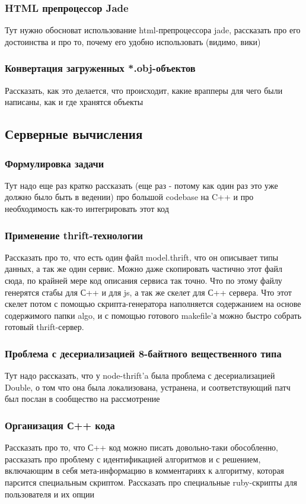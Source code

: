 \documentclass[12pt, a4paper]{article}
\begin{document}
\subsubsection{HTML препроцессор Jade}
Тут нужно обосноват использование html-препроцессора jade, рассказать про его
достоинства и про то, почему его удобно использовать (видимо, вики)
\subsubsection{Конвертация загруженных *.obj-объектов}
Рассказать, как это делается, что происходит, какие врапперы для чего были
написаны, как и где хранятся объекты

\subsection{Серверные вычисления}
\subsubsection{Формулировка задачи}
Тут надо еще раз кратко рассказать (еще раз - потому как один раз это уже должно было
быть в ведении) про большой codebase на C++ и про необходимость как-то
интегрировать этот код
\subsubsection{Применение thrift-технологии}
Рассказать про то, что есть один файл model.thrift, что он описывает типы
данных, а так же один сервис. Можно даже скопировать частично этот файл сюда, по
крайней мере код описания сервиса так точно. Что по этому файлу генерятся стабы
для С++ и для js, а так же скелет для С++ сервера. Что этот скелет потом
с помощью скрипта-генератора наполняется содержанием на основе содержимого папки
algo, и с помощью готового makefile'а можно быстро собрать готовый
thrift-сервер.
\subsubsection{Проблема с десериализацией 8-байтного вещественного типа}
Тут надо рассказать, что у node-thrift'a была проблема с десериализацией Double,
о том что она была локализована, устранена, и соответствующий патч был послан в
сообщество на рассмотрение
\subsubsection{Организация С++ кода}
Рассказать про то, что С++ код можно писать довольно-таки обособленно,
рассказать про проблему с идентификацией алгоритмов и с решением, включающим в
себя мета-информацию в комментариях к алгоритму, которая парсится специальным
скриптом. Рассказать про специальные ruby-скрипты для пользователя и их опции
\end{document}
